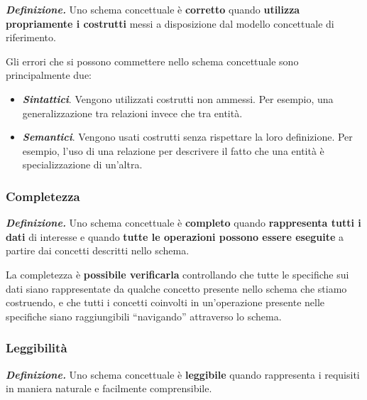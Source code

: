 \documentclass[a4paper]{article}
\newcommand{\dquotes}[1]{``#1''}
\begin{document}
	\textcolor{Red3}{\textbf{\emph{Definizione.}}} Uno schema concettuale è \textbf{corretto} quando \textbf{utilizza propriamente i costrutti} messi a disposizione dal modello concettuale di riferimento.\newline
	
	\noindent
	Gli errori che si possono commettere nello schema concettuale sono principalmente due:
	
	\begin{itemize}
		\item \textcolor{Red3}{\textbf{\emph{Sintattici}}}. Vengono utilizzati costrutti non ammessi. \textcolor{Green4}{Per esempio}, una generalizzazione tra relazioni invece che tra entità.
		
		\item \textcolor{Red3}{\textbf{\emph{Semantici}}}. Vengono usati costrutti senza rispettare la loro definizione. \textcolor{Green4}{Per esempio}, l'uso di una relazione per descrivere il fatto che una entità è specializzazione di un'altra.
	\end{itemize}
	
	\subsubsection{Completezza}\label{par: completezza}
	
	\textcolor{Red3}{\textbf{\emph{Definizione.}}} Uno schema concettuale è \textbf{completo} quando \textbf{rappresenta tutti i dati} di interesse e quando \textbf{tutte le operazioni possono essere eseguite} a partire dai concetti descritti nello schema.\newline
	
	\noindent
	La completezza è \textbf{possibile verificarla} controllando che tutte le specifiche sui dati siano rappresentate da qualche concetto presente nello schema che stiamo costruendo, e che tutti i concetti coinvolti in un'operazione presente nelle specifiche siano raggiungibili \dquotes{navigando} attraverso lo schema.
	
	\subsubsection{Leggibilità}\label{par: leggibilità}
	
	\textcolor{Red3}{\textbf{\emph{Definizione.}}} Uno schema concettuale è \textbf{leggibile} quando rappresenta i requisiti in maniera naturale e facilmente comprensibile.\newline
	
\end{document}
